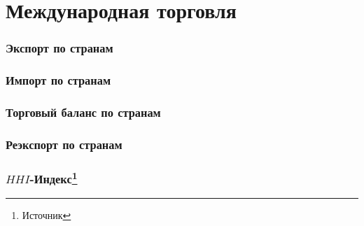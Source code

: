 \section{Международная торговля}

\begin{frame}
    \frametitle{Экспорт по странам}
    \begin{center}
        
    \end{center}
\end{frame}

\begin{frame}
    \frametitle{Импорт по странам}
    \begin{center}
        
    \end{center}
\end{frame}

\begin{frame}
    \frametitle{Торговый баланс по странам}
    \begin{center}
        
    \end{center}
\end{frame}

\begin{frame}
    \frametitle{Реэкспорт по странам}
    \begin{center}
        
    \end{center}
\end{frame}

\begin{frame}
    \frametitle{$HHI$-Индекс\footnote{Источник}}
    \begin{center}
        
    \end{center}
\end{frame}